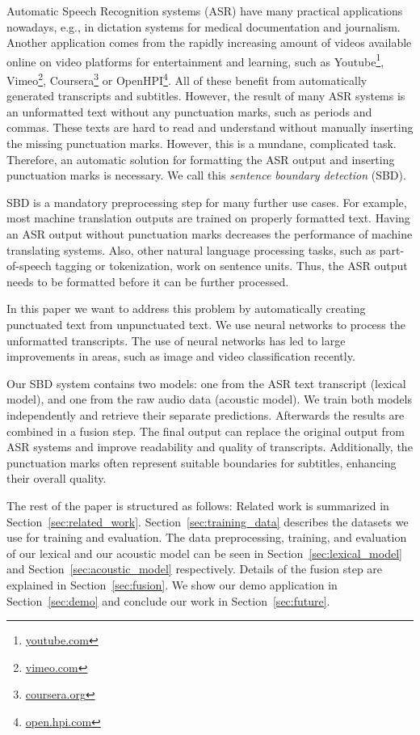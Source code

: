 Automatic Speech Recognition systems (ASR) have many practical applications nowadays, e.g., in dictation systems for medical documentation and journalism.
Another application comes from the rapidly increasing amount of videos available online on video platforms for entertainment and learning, such as Youtube\footnote{\url{youtube.com}}, Vimeo\footnote{\url{vimeo.com}}, Coursera\footnote{\url{coursera.org}} or OpenHPI\footnote{\url{open.hpi.com}}.
All of these benefit from automatically generated transcripts and subtitles.
However, the result of many ASR systems is an unformatted text without any punctuation marks, such as periods and commas.
These texts are hard to read and understand without manually inserting the missing punctuation marks.
However, this is a mundane, complicated task.
Therefore, an automatic solution for formatting the ASR output and inserting punctuation marks is necessary.
We call this \emph{sentence boundary detection} (SBD).

SBD is a mandatory preprocessing step for many further use cases.
For example, most machine translation outputs are trained on properly formatted text.
Having an ASR output without punctuation marks decreases the performance of machine translating systems.
Also, other natural language processing tasks, such as part-of-speech tagging or tokenization, work on sentence units.
Thus, the ASR output needs to be formatted before it can be further processed.

In this paper we want to address this problem by automatically creating punctuated text from unpunctuated text.
We use neural networks to process the unformatted transcripts.
The use of neural networks has led to large improvements in areas, such as image and video classification recently. %

Our SBD system contains two models: one from the ASR text transcript (lexical model), and one from the raw audio data (acoustic model).
We train both models independently and retrieve their separate predictions.
Afterwards the results are combined in a fusion step.
The final output can replace the original output from ASR systems and improve readability and quality of transcripts.
Additionally, the punctuation marks often represent suitable boundaries for subtitles, enhancing their overall quality.

The rest of the paper is structured as follows:
Related work is summarized in Section~\ref{sec:related_work}.
Section~\ref{sec:training_data} describes the datasets we use for training and evaluation.
The data preprocessing, training, and evaluation of our lexical and our acoustic model can be seen in Section~\ref{sec:lexical_model} and Section~\ref{sec:acoustic_model} respectively.
Details of the fusion step are explained in Section~\ref{sec:fusion}.
We show our demo application in Section~\ref{sec:demo} and conclude our work in Section~\ref{sec:future}.

